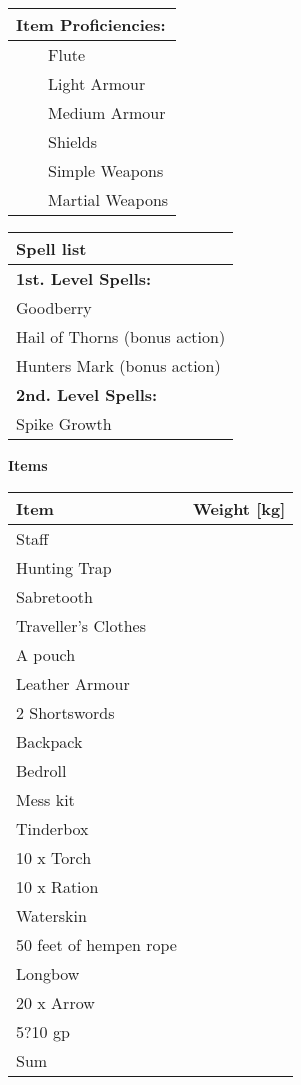 \documentclass[11pt]{article}
\newcommand{\tabitem}{~~\llap{--}~~}
\begin{document}
\begin{multicols}{2}
\vspace{4mm}

\noindent \begin{tabularx}{\linewidth}{@{}l}
{\Large \textbf{Item Proficiencies:}} \\
\hline
\tabitem Flute \\
\tabitem Light Armour \\
\tabitem Medium Armour \\
\tabitem Shields \\
\tabitem Simple Weapons \\
\tabitem Martial Weapons
		\end{tabularx}

\vspace{4mm}

\noindent \begin{tabularx}{\linewidth}{@{}l}
{\Large \textbf{Spell list}} 		\\
\hline
\textbf{1st. Level Spells:}			\\
Goodberry							\\		
Hail of Thorns (bonus action)		\\
Hunters Mark (bonus action)			\\

\textbf{2nd. Level Spells:}			\\
Spike Growth
		\end{tabularx}
	\end{multicols}

\clearpage

	\begin{center}
{\LARGE \textbf{Items}}
	\end{center}

	\begin{tabularx}{\textwidth}{X|r}
Item & Weight [kg] \\
\hline
Staff	 		 							& 			\\
Hunting Trap	 		 					& 			\\
Sabretooth 		 							& 			\\
Traveller's Clothes	 						& 			\\
A pouch	 		 							& 			\\
Leather Armour	 							& 			\\
2 Shortswords	 							& 			\\
Backpack		 							& 			\\
Bedroll			 							& 			\\
Mess kit		 							& 			\\
Tinderbox		 							& 			\\
10 x Torch	 								& 			\\
10 x Ration		 							& 			\\
Waterskin		 							& 			\\
50 feet of hempen rope						& 			\\
Longbow			 							& 			\\
20 x Arrow		 							& 			\\
5?10 gp					 					& 			\\
\hline
Sum 										& 
	\end{tabularx}
\end{document}
